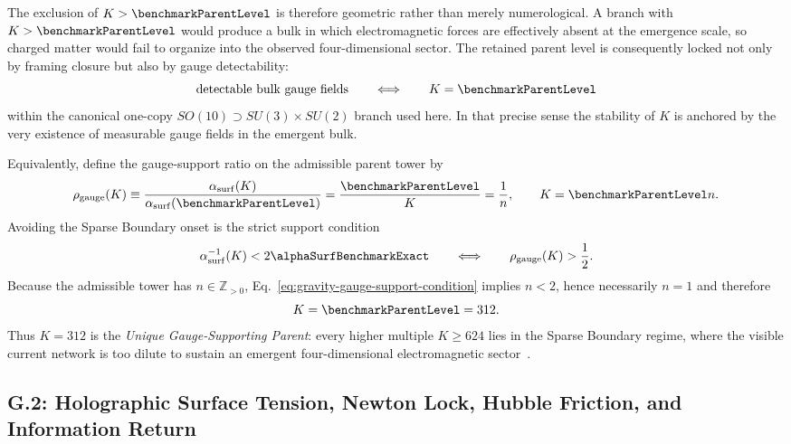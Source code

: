 \documentclass[11pt]{article}
\begin{document}
The exclusion of $K>\benchmarkParentLevel$ is therefore geometric rather than merely numerological. A branch with $K>\benchmarkParentLevel$ would produce a bulk in which electromagnetic forces are effectively absent at the emergence scale, so charged matter would fail to organize into the observed four-dimensional sector. The retained parent level is consequently locked not only by framing closure but also by gauge detectability:
\begin{equation}
\label{eq:gravity-gauge-detectability-lock}
 \text{detectable bulk gauge fields}
 \qquad\Longleftrightarrow\qquad
 K=\benchmarkParentLevel
\end{equation}
within the canonical one-copy $SO(10)\supset SU(3)\times SU(2)$ branch used here. In that precise sense the stability of $K$ is anchored by the very existence of measurable gauge fields in the emergent bulk.

Equivalently, define the gauge-support ratio on the admissible parent tower by
\begin{equation}
\label{eq:gravity-gauge-support-ratio}
 \rho_{\rm gauge}(K)
 \equiv
 \frac{\alpha_{\rm surf}(K)}{\alpha_{\rm surf}(\benchmarkParentLevel)}
 =
 \frac{\benchmarkParentLevel}{K}
 =
 \frac{1}{n},
 \qquad
 K=\benchmarkParentLevel n.
\end{equation}
Avoiding the Sparse Boundary onset is the strict support condition
\begin{equation}
\label{eq:gravity-gauge-support-condition}
 \alpha^{-1}_{\rm surf}(K)<2\alphaSurfBenchmarkExact
 \qquad\Longleftrightarrow\qquad
 \rho_{\rm gauge}(K)>\frac12.
\end{equation}
Because the admissible tower has $n\in\mathbb Z_{>0}$, Eq.~\eqref{eq:gravity-gauge-support-condition} implies $n<2$, hence necessarily $n=1$ and therefore
\begin{equation}
\label{eq:gravity-unique-gauge-supporting-parent}
 K=\benchmarkParentLevel=312.
\end{equation}
Thus $K=312$ is the \emph{Unique Gauge-Supporting Parent}: every higher multiple $K\ge624$ lies in the Sparse Boundary regime, where the visible current network is too dilute to sustain an emergent four-dimensional electromagnetic sector~\cite{friedan1987,witten1989,gko1985}.

\subsection*{G.2: Holographic Surface Tension, Newton Lock, Hubble Friction, and Information Return}
\end{document}
